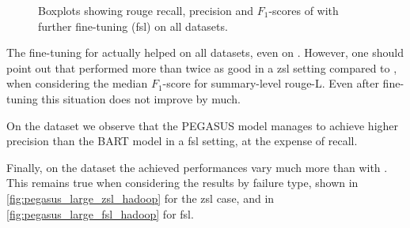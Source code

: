 \begin{figure}[p]
\centering
{}%
\hfill{}%
%
\hfill{}%
\caption{Boxplots showing \acs*{rouge} recall, precision and \(F_1\)-scores
of  with further fine-tuning (\acs*{fsl}) on all datasets.}
\label{fig:pegasus_large_fsl_all_datasets}
\end{figure}

The fine-tuning for  actually helped on all datasets, even on \telco{}.
However, one should point out that  performed more than twice as good in a \ac{zsl} setting
compared to , when considering the median \(F_1\)-score for summary-level \acs*{rouge}-L.
Even after fine-tuning this situation does not improve by much.

On the \telco{} dataset we observe that the PEGASUS model manages to achieve higher precision than the BART model in a \ac{fsl} setting,
at the expense of recall.

Finally, on the \hadoop{} dataset the achieved performances vary much more than with .
This remains true when considering the results by failure type,
shown in \autoref{fig:pegasus_large_zsl_hadoop} for the \ac{zsl} case,
and in \autoref{fig:pegasus_large_fsl_hadoop} for \ac{fsl}.

